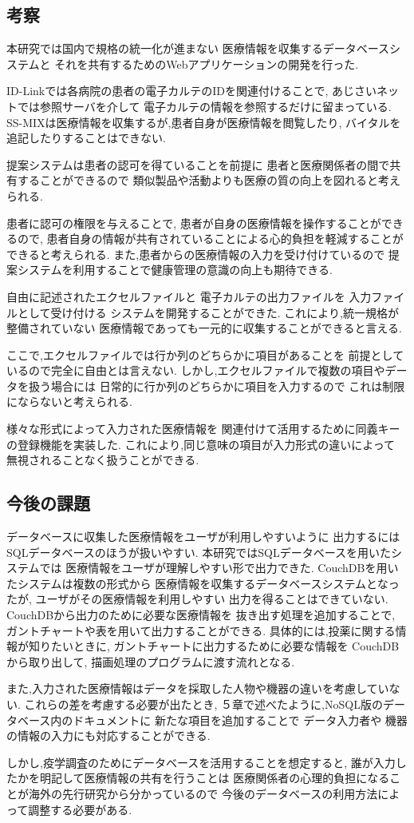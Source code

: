 \subsection{考察}
  本研究では国内で規格の統一化が進まない
  医療情報を収集するデータベースシステムと
  それを共有するためのWebアプリケーションの開発を行った.

  ID-Linkでは各病院の患者の電子カルテのIDを関連付けることで,
  あじさいネットでは参照サーバを介して
  電子カルテの情報を参照するだけに留まっている.
  SS-MIXは医療情報を収集するが,患者自身が医療情報を閲覧したり,
  バイタルを追記したりすることはできない.

  提案システムは患者の認可を得ていることを前提に
  患者と医療関係者の間で共有することができるので
  類似製品や活動よりも医療の質の向上を図れると考えられる.

  患者に認可の権限を与えることで,
  患者が自身の医療情報を操作することができるので,
  患者自身の情報が共有されていることによる心的負担を軽減することができると考えられる.
  また,患者からの医療情報の入力を受け付けているので
  提案システムを利用することで健康管理の意識の向上も期待できる.

  自由に記述されたエクセルファイルと
  電子カルテの出力ファイルを
  入力ファイルとして受け付ける
  システムを開発することができた.
  これにより,統一規格が整備されていない
  医療情報であっても一元的に収集することができると言える.

  ここで,エクセルファイルでは行か列のどちらかに項目があることを
  前提としているので完全に自由とは言えない.
  しかし,エクセルファイルで複数の項目やデータを扱う場合には
  日常的に行か列のどちらかに項目を入力するので
  これは制限にならないと考えられる.

  様々な形式によって入力された医療情報を
  関連付けて活用するために同義キーの登録機能を実装した.
  これにより,同じ意味の項目が入力形式の違いによって
  無視されることなく扱うことができる.


\subsection{今後の課題}
  データベースに収集した医療情報をユーザが利用しやすいように
  出力するにはSQLデータベースのほうが扱いやすい.
  本研究ではSQLデータベースを用いたシステムでは
  医療情報をユーザが理解しやすい形で出力できた.
  CouchDBを用いたシステムは複数の形式から
  医療情報を収集するデータベースシステムとなったが,
  ユーザがその医療情報を利用しやすい
  出力を得ることはできていない.
  CouchDBから出力のために必要な医療情報を
  抜き出す処理を追加することで,
  ガントチャートや表を用いて出力することができる.
  具体的には,投薬に関する情報が知りたいときに,
  ガントチャートに出力するために必要な情報を
  CouchDBから取り出して,
  描画処理のプログラムに渡す流れとなる.

  また,入力された医療情報はデータを採取した人物や機器の違いを考慮していない.
  これらの差を考慮する必要が出たとき,
  ５章で述べたように,NoSQL版のデータベース内のドキュメントに
  新たな項目を追加することで
  データ入力者や
  機器の情報の入力にも対応することができる.

  しかし,疫学調査のためにデータベースを活用することを想定すると,
  誰が入力したかを明記して医療情報の共有を行うことは
  医療関係者の心理的負担になることが海外の先行研究から分かっているので
  今後のデータベースの利用方法によって調整する必要がある.
  \cite{bibi10}
